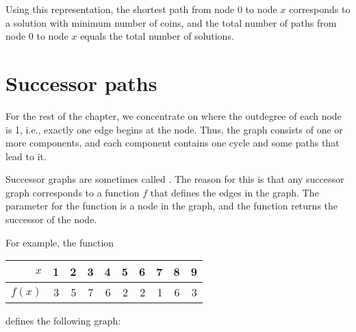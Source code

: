Using this representation,
the shortest path from node 0 to node $x$
corresponds to a solution with minimum number of coins,
and the total number of paths from node 0 to node $x$
equals the total number of solutions.

\section{Successor paths}


For the rest of the chapter,
we concentrate on 
where the outdegree of each node is 1, i.e.,
exactly one edge begins at the node.
Thus, the graph consists of one or more
components, and each component contains
one cycle and some paths that lead to it.

Successor graphs are sometimes called
.
The reason for this is that any successor graph
corresponds to a function $f$ that defines
the edges in the graph.
The parameter for the function is a node in the graph,
and the function returns the successor of the node.

\begin{samepage}
For example, the function
\begin{center}
\begin{tabular}{r|rrrrrrrrr}
$x$ & 1 & 2 & 3 & 4 & 5 & 6 & 7 & 8 & 9 \\
\hline
$f(x)$ & 3 & 5 & 7 & 6 & 2 & 2 & 1 & 6 & 3 \\
\end{tabular}
\end{center}
\end{samepage}
defines the following graph:
\begin{center}
\end{center}

